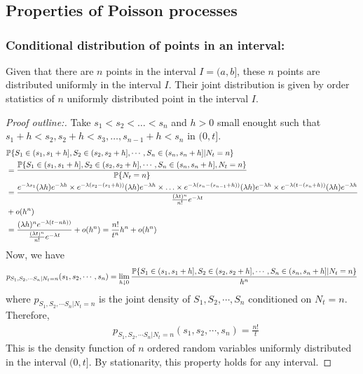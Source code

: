 \documentclass[all-lectures.tex]{subfiles}
\begin{document}
%
\setcounter{chapter}{1}
\setcounter{section}{3}

\section*{}
\setcounter{subsection}{0}
\subsection{Properties of Poisson processes}
\subsubsection*{Conditional distribution of points in an interval:} 
\begin{thm}
Given that there are $n$ points in the interval $I = (a,b]$, these $n$ points are distributed uniformly in the interval $I$. Their joint distribution is given by order statistics of $n$ uniformly distributed point in the interval $I$.
\end{thm}
\begin{proof}[Proof outline:]
{Take $s_1 < s_2 < \dots<s_n$ and $h>0$ small enought such that $s_1+h < s_2, s_2+h < s_3, \dots, s_{n-1}+h < s_n$ in $(0,t]$.
\begin{align*}
&\P\{S_1\in (s_1,s_1+h],S_2\in (s_2,s_2+h],\cdots,S_n\in (s_n,s_n+h] |N_t = n\}  \\
&= \frac{\P\{S_1\in (s_1,s_1+h],S_2\in (s_2,s_2+h],\cdots,S_n\in (s_n,s_n+h],N_t=n\}}{\P\{N_t=n\}}  \\
 &= \frac{ e^{-\lambda s_1} (\lambda h)e^{-\lambda h} \times e^{-\lambda (s_2-(s_1+h))}(\lambda h)e^{-\lambda h} \times \ldots \times e^{-\lambda (s_n-(s_{n-1}+h))} (\lambda h) e^{-\lambda h} \times e^{-\lambda (t-(s_n+h))} (\lambda h)  e^{-\lambda h} }{ \frac{(\lambda t)^n }{n!} e^{-\lambda t} } \\ &+ o(h^n)\\
 &= \frac{ (\lambda h)^n e^{-\lambda(t-nh))}}{ \frac{(\lambda t)^n }{n!} e^{-\lambda t} } + o(h^n) = \frac{n!}{t^n} h^n + o(h^n)
\end{align*}
Now, we have 
\begin{align*}
p_{S_1,S_2,\cdots S_n | N_t=n}(s_1,s_2,\cdots,s_n) &= \lim_{h \downarrow 0} \frac{\P\{S_1\in (s_1,s_1+h],S_2\in (s_2,s_2+h],\cdots,S_n\in (s_n,s_n+h] |N_t = n\}}{h^n} \\
\end{align*}
where $p_{S_1,S_2,\cdots S_n | N_t=n}$ is the joint density of $S_1,S_2,\cdots,S_n$ conditioned on $N_t=n$. Therefore, 
\begin{align*}
&p_{S_1,S_2,\cdots S_n | N_t=n}(s_1,s_2,\cdots,s_n) = \frac{n!}{t}
\end{align*}
}
This is the density function of $n$ ordered random variables uniformly distributed in the interval $(0,t]$. By stationarity, this property holds for any interval. \qedhere
\end{proof}
\end{document}
